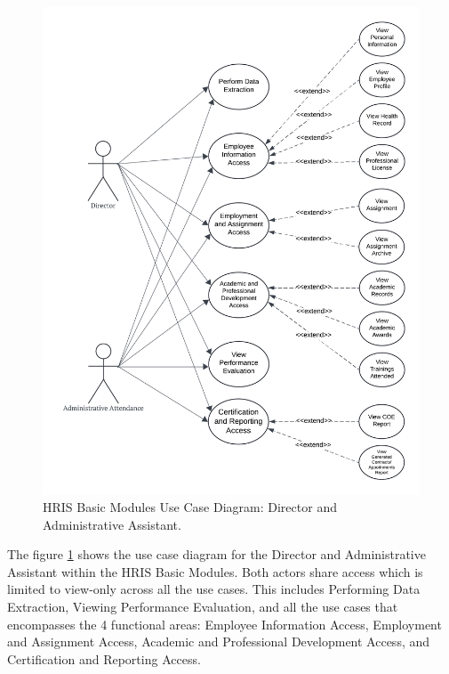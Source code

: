     \begin{figure}[H] 
        \centering
        \includegraphics[width=0.9\linewidth]{figures/images/diagrams/usecase/use-case-basic-3.png}
        \caption{HRIS Basic Modules Use Case Diagram: Director and Administrative Assistant.}
        \label{fig:use-case-basic-3}
    \end{figure}

    The figure \ref{fig:use-case-basic-3} shows the use case diagram for the Director and Administrative Assistant within the HRIS Basic Modules. Both actors share access which is limited to view-only across all the use cases. This includes Performing Data Extraction, Viewing Performance Evaluation, and all the use cases that encompasses the 4 functional areas: Employee Information Access, Employment and Assignment Access, Academic and Professional Development Access, and Certification and Reporting Access. 

